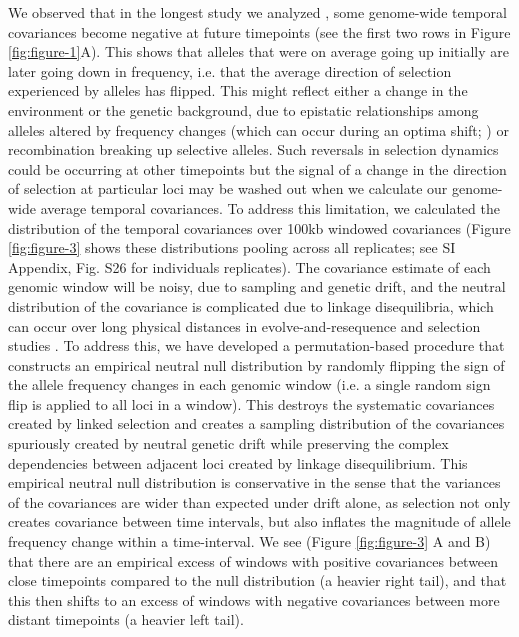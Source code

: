 \documentclass[9pt,twocolumn,twoside]{pnas-new}
\begin{document}
We observed that in the longest study  we analyzed \cite{Barghi2019-qy}, some
genome-wide temporal covariances become negative at future timepoints (see the
first two rows in Figure \ref{fig:figure-1}A). This shows that alleles that
were on average going up initially are later going down in frequency, i.e.
that the average direction of selection experienced by alleles has flipped.
This might reflect either a change in the environment or the genetic
background, due to epistatic relationships among alleles altered by frequency
changes (which can occur during an optima shift; \cite{Hayward2019-kt}) or
recombination breaking up selective alleles. Such reversals in selection
dynamics could be occurring at other timepoints but the signal of a change in
the direction of selection at particular loci may be washed out when we
calculate our genome-wide average temporal covariances.  To address this
limitation, we calculated the distribution of the temporal covariances over
100kb windowed covariances (Figure \ref{fig:figure-3} shows these distributions
pooling across all replicates; see SI Appendix, Fig. S26 for individuals
replicates). The covariance estimate of each genomic window will be noisy, due
to sampling and genetic drift, and the neutral distribution of the covariance
is complicated due to linkage disequilibria, which can occur over long physical
distances in evolve-and-resequence and selection studies
\cite{Nuzhdin2013-gf,Baldwin-Brown2014-cl}.  To address this, we have developed
a permutation-based procedure that constructs an empirical neutral null
distribution by randomly flipping the sign of the allele frequency changes in
each genomic window (i.e. a single random sign flip is applied to all loci in a
window). This destroys the systematic covariances created by linked selection
and creates a sampling distribution of the covariances spuriously created by
neutral genetic drift while preserving the complex dependencies between
adjacent loci created by linkage disequilibrium.  This empirical neutral null
distribution is conservative in the sense that the variances of the covariances
are wider than expected under drift alone, as selection not only creates
covariance between time intervals, but also inflates the magnitude of allele
frequency change within a time-interval.  We see (Figure \ref{fig:figure-3} A
and B) that there are an empirical excess of windows with positive covariances
between close timepoints compared to the null distribution (a heavier right
tail), and that this then shifts to an excess of windows with negative
covariances between more distant timepoints (a heavier left tail).
\end{document}
